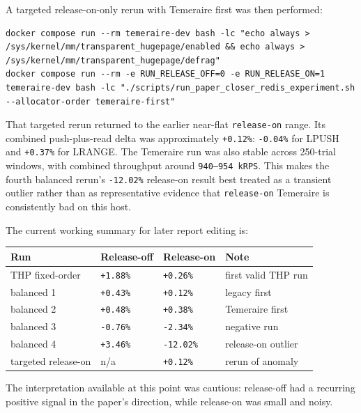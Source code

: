 \documentclass[a4paper,11pt]{article}
\begin{document}
A targeted release-on-only rerun with Temeraire first was then performed:

\begin{lstlisting}[style=codestyle]
docker compose run --rm temeraire-dev bash -lc "echo always > /sys/kernel/mm/transparent_hugepage/enabled && echo always > /sys/kernel/mm/transparent_hugepage/defrag"
docker compose run --rm -e RUN_RELEASE_OFF=0 -e RUN_RELEASE_ON=1 temeraire-dev bash -lc "./scripts/run_paper_closer_redis_experiment.sh --allocator-order temeraire-first"
\end{lstlisting}

That targeted rerun returned to the earlier near-flat \texttt{release-on}
range. Its combined push-plus-read delta was approximately \texttt{+0.12\%}:
\texttt{-0.04\%} for LPUSH and \texttt{+0.37\%} for LRANGE. The Temeraire run
was also stable across 250-trial windows, with combined throughput around
\texttt{940--954 kRPS}. This makes the fourth balanced rerun's
\texttt{-12.02\%} release-on result best treated as a transient outlier rather
than as representative evidence that \texttt{release-on} Temeraire is
consistently bad on this host.

The current working summary for later report editing is:

\begin{center}
\begin{tabular}{@{}llll@{}}
\toprule
Run & Release-off & Release-on & Note \\
\midrule
THP fixed-order & \texttt{+1.88\%} & \texttt{+0.26\%} & first valid THP run \\
balanced 1 & \texttt{+0.43\%} & \texttt{+0.12\%} & legacy first \\
balanced 2 & \texttt{+0.48\%} & \texttt{+0.38\%} & Temeraire first \\
balanced 3 & \texttt{-0.76\%} & \texttt{-2.34\%} & negative run \\
balanced 4 & \texttt{+3.46\%} & \texttt{-12.02\%} & release-on outlier \\
targeted release-on & n/a & \texttt{+0.12\%} & rerun of anomaly \\
\bottomrule
\end{tabular}
\end{center}

The interpretation available at this point was cautious: release-off had a
recurring positive signal in the paper's direction, while release-on was small
and noisy.

\medskip
\noindent{}
\end{document}
